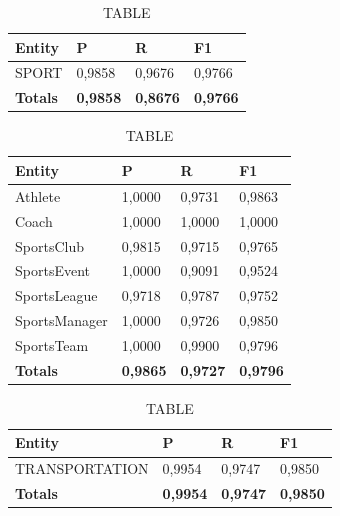 \documentclass[thesis=M,english]{FITthesis}[2018/05/30]
\begin{document}

	\begin{table}[H]\centering
		\caption{TABLE}
		\label{}
		\begin{tabular}{|l|l|l|l|}
			\hline {\textbf{Entity}} & {\textbf{P}} & {\textbf{R}} & {\textbf{F1}}\\\hline
				SPORT & 0,9858 & 0,9676 & 0,9766\\\hline
				\textbf{Totals} & \textbf{0,9858} & \textbf{0,8676} & \textbf{0,9766}\\\hline
		\end{tabular}
	\end{table}

	\begin{table}[H]\centering
		\caption{TABLE}
		\label{}
		\begin{tabular}{|l|l|l|l|}
			\hline {\textbf{Entity}} & {\textbf{P}} & {\textbf{R}} & {\textbf{F1}}\\\hline
				Athlete & 1,0000 & 0,9731 & 0,9863\\
				Coach & 1,0000 & 1,0000 & 1,0000\\
				SportsClub & 0,9815 & 0,9715 & 0,9765\\
				SportsEvent & 1,0000 & 0,9091 & 0,9524\\
				SportsLeague & 0,9718 & 0,9787 & 0,9752\\
				SportsManager & 1,0000 & 0,9726 & 0,9850\\				
				SportsTeam & 1,0000 & 0,9900 & 0,9796\\\hline
				\textbf{Totals} & \textbf{0,9865} & \textbf{0,9727} & \textbf{0,9796}\\\hline
		\end{tabular}
	\end{table}	

	\begin{table}[H]\centering
		\caption{TABLE}
		\label{}
		\begin{tabular}{|l|l|l|l|}
			\hline {\textbf{Entity}} & {\textbf{P}} & {\textbf{R}} & {\textbf{F1}}\\\hline
				TRANSPORTATION & 0,9954 & 0,9747 & 0,9850\\\hline
				\textbf{Totals} & \textbf{0,9954} & \textbf{0,9747} & \textbf{0,9850}\\\hline
		\end{tabular}
	\end{table}
	
\end{document}
